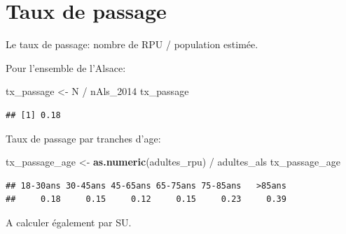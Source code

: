 \documentclass[]{article}
\newenvironment{Shaded}{\begin{snugshade}}{\end{snugshade}}
\newcommand{\KeywordTok}[1]{\textcolor[rgb]{0.13,0.29,0.53}{\textbf{{#1}}}}
\newcommand{\StringTok}[1]{\textcolor[rgb]{0.31,0.60,0.02}{{#1}}}
\newcommand{\NormalTok}[1]{{#1}}
\begin{document}
\section{Taux de passage}\label{taux-de-passage}

Le taux de passage: nombre de RPU / population estimée.

Pour l'ensemble de l'Alsace:

\begin{Shaded}
\begin{Highlighting}[]
\NormalTok{tx_passage <-}\StringTok{ }\NormalTok{N /}\StringTok{ }\NormalTok{nAls_2014}
\NormalTok{tx_passage}
\end{Highlighting}
\end{Shaded}

\begin{verbatim}
## [1] 0.18
\end{verbatim}

Taux de passage par tranches d'age:

\begin{Shaded}
\begin{Highlighting}[]
\NormalTok{tx_passage_age <-}\StringTok{ }\KeywordTok{as.numeric}\NormalTok{(adultes_rpu) /}\StringTok{ }\NormalTok{adultes_als}
\NormalTok{tx_passage_age}
\end{Highlighting}
\end{Shaded}

\begin{verbatim}
## 18-30ans 30-45ans 45-65ans 65-75ans 75-85ans   >85ans 
##     0.18     0.15     0.12     0.15     0.23     0.39
\end{verbatim}

A calculer également par SU.
\end{document}

